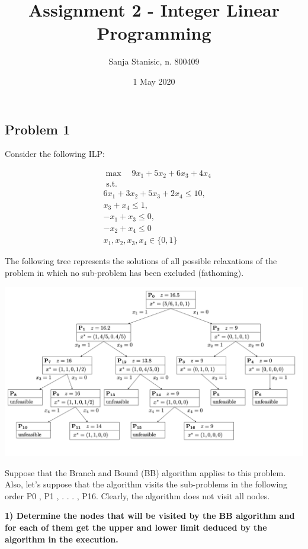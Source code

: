 \documentclass[]{article}
\title{Assignment 2 - Integer Linear Programming}
\author{Sanja Stanisic, n. 800409}
\date{1 May 2020}
\begin{document}
\maketitle

{
\setcounter{tocdepth}{5}
\tableofcontents
}
\hypertarget{problem-1}{%
\subsection{Problem 1}\label{problem-1}}

Consider the following ILP:

\[
\begin{aligned}
&\max \quad 9 x_{1}+5 x_{2}+6 x_{3}+4 x_{4}\\
&\text { s.t. } \quad \\
&6 x_{1}+3 x_{2}+5 x_{3}+2 x_{4} \leq 10, \\
&x_{3}+x_{4} \leq 1,\\
&-x_{1}+x_{3} \leq 0,\\
&-x_{2}+x_{4} \leq 0\\
&x_{1}, x_{2}, x_{3}, x_{4} \in\{0,1\}
\end{aligned}
\]

The following tree represents the solutions of all possible relaxations
of the problem in which no sub-problem has been excluded (fathoming).

\includegraphics[width=7.29167in,height=\textheight]{tree.png}

Suppose that the Branch and Bound (BB) algorithm applies to this
problem. Also, let's suppose that the algorithm visits the sub-problems
in the following order P0 , P1 , . . . , P16. Clearly, the algorithm
does not visit all nodes.

\textbf{1) Determine the nodes that will be visited by the BB algorithm
and for each of them get the upper and lower limit deduced by the
algorithm in the execution.}
\end{document}
